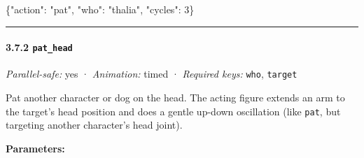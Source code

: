 \documentclass[
  12pt,
  letterpaper,
]{book}
\newenvironment{Shaded}{}{}
\newcommand{\DataTypeTok}[1]{\textcolor[rgb]{0.56,0.13,0.00}{#1}}
\newcommand{\DecValTok}[1]{\textcolor[rgb]{0.25,0.63,0.44}{#1}}
\newcommand{\FunctionTok}[1]{\textcolor[rgb]{0.02,0.16,0.49}{#1}}
\newcommand{\StringTok}[1]{\textcolor[rgb]{0.25,0.44,0.63}{#1}}
\begin{document}
\begin{Shaded}
\begin{Highlighting}[]
\FunctionTok{\{}\DataTypeTok{"action"}\FunctionTok{:} \StringTok{"pat"}\FunctionTok{,} \DataTypeTok{"who"}\FunctionTok{:} \StringTok{"thalia"}\FunctionTok{,} \DataTypeTok{"cycles"}\FunctionTok{:} \DecValTok{3}\FunctionTok{\}}
\end{Highlighting}
\end{Shaded}

\begin{center}\rule{0.5\linewidth}{0.5pt}\end{center}

\paragraph{\texorpdfstring{3.7.2
\texttt{pat\_head}}{3.7.2 pat\_head}}\label{pat_head}

\emph{Parallel-safe:} yes · \emph{Animation:} timed · \emph{Required
keys:} \texttt{who}, \texttt{target}

Pat another character or dog on the head. The acting figure extends an
arm to the target's head position and does a gentle up-down oscillation
(like \texttt{pat}, but targeting another character's head joint).

\textbf{Parameters:}
\end{document}
